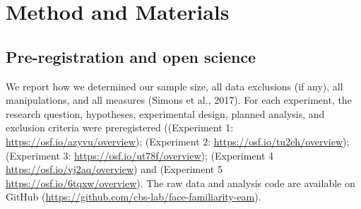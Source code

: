 \documentclass[
  letterpaper,
  DIV=11,
  numbers=noendperiod]{scrartcl}
\begin{document}
\begin{table}

\caption{\label{tbl-exp}An overview of the experimental work}


\end{table}%

\section{Method and Materials}\label{method-and-materials}

\subsection{Pre-registration and open
science}\label{pre-registration-and-open-science}

We report how we determined our sample size, all data exclusions (if
any), all manipulations, and all measures (Simons et al., 2017). For
each experiment, the research question, hypotheses, experimental design,
planned analysis, and exclusion criteria were preregistered ((Experiment
1: \url{https://osf.io/azyvu/overview}); (Experiment 2:
\url{https://osf.io/tu2eh/overview}); (Experiment 3:
\url{https://osf.io/ut78f/overview}); (Experiment 4
\url{https://osf.io/vj2aq/overview}) and (Experiment 5
\url{https://osf.io/6tqxw/overview}). The raw data and analysis code are
available on GitHub
(\url{https://github.com/cbs-lab/face-familiarity-eam}).
\end{document}

